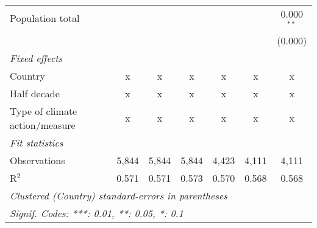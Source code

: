 \begin{tabular}{lcccccc}
   Population total                                                     &         &                &                &                &                & 0.000$^{**}$\\   
                                                                        &         &                &                &                &                & (0.000)\\   
   \emph{Fixed effects}\\
   Country                                                              & x       & x              & x              & x              & x              & x\\  
   Half decade                                                          & x       & x              & x              & x              & x              & x\\  
   Type of climate action/measure                                       & x       & x              & x              & x              & x              & x\\  
   \midrule \emph{Fit statistics}\\
   Observations                                                         & 5,844   & 5,844          & 5,844          & 4,423          & 4,111          & 4,111\\  
   R$^2$                                                                & 0.571   & 0.571          & 0.573          & 0.570          & 0.568          & 0.568\\  
   \midrule
   \multicolumn{7}{l}{\emph{Clustered (Country) standard-errors in parentheses}}\\
   \multicolumn{7}{l}{\emph{Signif. Codes: ***: 0.01, **: 0.05, *: 0.1}}\\
\end{tabular}
\par\endgroup


